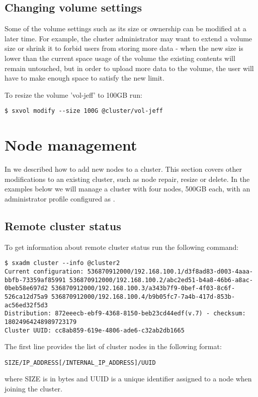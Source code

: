 \subsection{Changing volume settings}
Some of the volume settings such as its size or ownership can be
modified at a later time. For example, the cluster administrator may
want to extend a volume size or shrink it to forbid users from storing
more data - when the new size is lower than the current space usage of
the volume the existing contents will remain untouched, but in order
to upload more data to the volume, the user will have to make enough
space to satisfy the new limit.

To resize the volume 'vol-jeff' to 100GB run:
\begin{lstlisting}
$ sxvol modify --size 100G @cluster/vol-jeff
\end{lstlisting}

\section{Node management}
In  we described how to add new nodes to a cluster. This
section covers other modifications to an existing cluster, such as node
repair, resize or delete. In the examples below we will manage a cluster
with four nodes, 500GB each, with an administrator profile configured
as .

\subsection{Remote cluster status}
To get information about remote cluster status run the following command:
\begin{lstlisting}
$ sxadm cluster --info @cluster2
Current configuration: 536870912000/192.168.100.1/d3f8ad83-d003-4aaa-bbfb-73359af85991 536870912000/192.168.100.2/abc2ed51-b4a8-46b6-a8ac-0beb58e697d2 536870912000/192.168.100.3/a343b7f9-0bef-4f03-8c6f-526ca12d75a9 536870912000/192.168.100.4/b9b05fc7-7a4b-417d-853b-ac56ed32f5d3 
Distribution: 872eeecb-ebf9-4368-8150-beb23cd44edf(v.7) - checksum: 18024964248989723179
Cluster UUID: cc8ab859-619e-4806-ade6-c32ab2db1665
\end{lstlisting}
The first line provides the list of cluster nodes in the following format:
\begin{lstlisting}
SIZE/IP_ADDRESS[/INTERNAL_IP_ADDRESS]/UUID
\end{lstlisting}
where SIZE is in bytes and UUID is a unique identifier assigned to a node
when joining the cluster.

